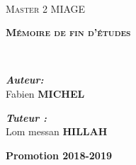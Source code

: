 \begin{titlepage}
\begin{center}

\setlength{\parindent}{0pt}

~\\[1cm]


\textsc{\Huge Master 2 MIAGE}\\[0.5cm]

\vspace{5mm}

\textsc{\huge \bfseries  Mémoire de fin d'études}\\[1.5cm]



\HRule

{\huge \bfseries \thetitle \\[0.4cm] }


\HRule

\vspace{5mm}

\begin{minipage}{0.4\textwidth}
\begin{flushleft} \large
\emph{\textbf{Auteur:}}\\
Fabien \textsc{\textbf{MICHEL}}
\end{flushleft}
\end{minipage}
\begin{minipage}{0.4\textwidth}
\begin{flushright} \large
\emph{\textbf{Tuteur :}} \\
Lom messan \textsc{\textbf{HILLAH}}
\end{flushright}
\end{minipage}

\vfill

{\huge \bfseries Promotion 2018-2019}

\end{center}
\end{titlepage}